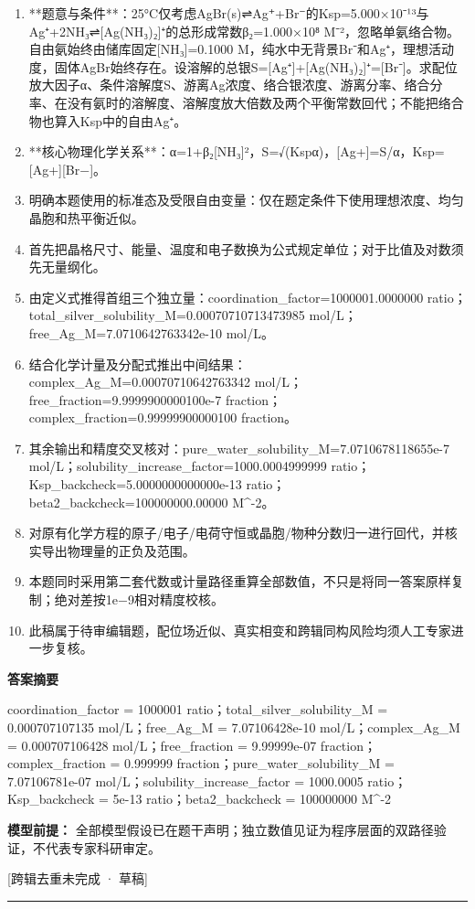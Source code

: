 \documentclass[UTF8,11pt,a4paper]{ctexart}
\begin{document}
\begin{enumerate}
\item **题意与条件**：25°C仅考虑AgBr(s)⇌Ag⁺+Br⁻的Ksp=5.000×10⁻¹³与Ag⁺+2NH₃⇌[Ag(NH₃)₂]⁺的总形成常数β₂=1.000×10⁸ M⁻²，忽略单氨络合物。自由氨始终由储库固定[NH₃]=0.1000 M，纯水中无背景Br⁻和Ag⁺，理想活动度，固体AgBr始终存在。设溶解的总银S=[Ag⁺]+[Ag(NH₃)₂]⁺=[Br⁻]。求配位放大因子α、条件溶解度S、游离Ag浓度、络合银浓度、游离分率、络合分率、在没有氨时的溶解度、溶解度放大倍数及两个平衡常数回代；不能把络合物也算入Ksp中的自由Ag⁺。
\item **核心物理化学关系**：α=1+β₂[NH₃]²，S=√(Kspα)，[Ag+]=S/α，Ksp=[Ag+][Br−]。
\item 明确本题使用的标准态及受限自由变量：仅在题定条件下使用理想浓度、均匀晶胞和热平衡近似。
\item 首先把晶格尺寸、能量、温度和电子数换为公式规定单位；对于比值及对数须先无量纲化。
\item 由定义式推得首组三个独立量：coordination\_factor=1000001.0000000 ratio；total\_silver\_solubility\_M=0.00070710713473985 mol/L；free\_Ag\_M=7.0710642763342e-10 mol/L。
\item 结合化学计量及分配式推出中间结果：complex\_Ag\_M=0.00070710642763342 mol/L；free\_fraction=9.9999900000100e-7 fraction；complex\_fraction=0.99999900000100 fraction。
\item 其余输出和精度交叉核对：pure\_water\_solubility\_M=7.0710678118655e-7 mol/L；solubility\_increase\_factor=1000.0004999999 ratio；Ksp\_backcheck=5.0000000000000e-13 ratio；beta2\_backcheck=100000000.00000 M\textasciicircum{}-2。
\item 对原有化学方程的原子/电子/电荷守恒或晶胞/物种分数归一进行回代，并核实导出物理量的正负及范围。
\item 本题同时采用第二套代数或计量路径重算全部数值，不只是将同一答案原样复制；绝对差按1e−9相对精度校核。
\item 此稿属于待审编辑题，配位场近似、真实相变和跨辑同构风险均须人工专家进一步复核。
\end{enumerate}
\noindent\textbf{答案摘要}\par
coordination\_factor = 1000001 ratio；total\_silver\_solubility\_M = 0.000707107135 mol/L；free\_Ag\_M = 7.07106428e-10 mol/L；complex\_Ag\_M = 0.000707106428 mol/L；free\_fraction = 9.99999e-07 fraction；complex\_fraction = 0.999999 fraction；pure\_water\_solubility\_M = 7.07106781e-07 mol/L；solubility\_increase\_factor = 1000.0005 ratio；Ksp\_backcheck = 5e-13 ratio；beta2\_backcheck = 100000000 M\textasciicircum{}-2\par
\noindent\textbf{模型前提：}
全部模型假设已在题干声明；独立数值见证为程序层面的双路径验证，不代表专家科研审定。\par
\noindent\textcolor{red!65!black}{[跨辑去重未完成 · 草稿]} \par
\medskip\hrule\medskip
{}
\end{document}
